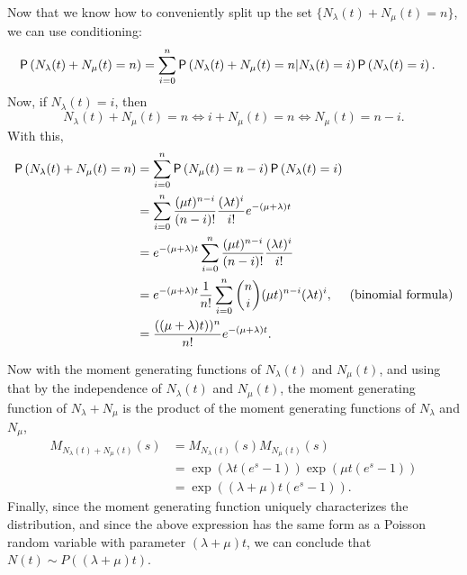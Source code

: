 \begin{exercise}
\begin{solution}
Now that we know how to conveniently split up the set $\{N_\lambda(t) + N_\mu(t) = n\}$,  we can use conditioning: 
  \begin{equation*}
    \begin{split}
\P{N_\lambda(t) + N_\mu(t) = n} 
&= \sum_{i=0}^n \P{N_\lambda(t) + N_\mu(t) = n|N_\lambda(t) = i}\P{N_\lambda(t)=i}.
\end{split}
\end{equation*}
Now, if $N_\lambda(t)=i$, then 
\begin{equation*}
N_\lambda(t)+N_\mu(t) = n \iff 
i+N_\mu(t) = n \iff 
N_\mu(t) = n-i.
\end{equation*}
With this, 
  \begin{align*}\label{eq:002}
\P{N_\lambda(t) + N_\mu(t) = n} 
&= \sum_{i=0}^n \P{ N_\mu(t) = n-i}\P{N_\lambda(t)=i} \\
&= \sum_{i=0}^n \frac{(\mu t)^{n-i}}{(n-i)!} \frac{(\lambda t)^i}{i!} e^{-(\mu+\lambda)t} \\
&= e^{-(\mu+\lambda)t} \sum_{i=0}^n \frac{(\mu t)^{n-i}}{(n-i)!} \frac{(\lambda t)^i}{i!}  \\
&= e^{-(\mu+\lambda)t}\frac 1{n!} \sum_{i=0}^n {n \choose i }(\mu t)^{n-i}(\lambda t)^i, \quad\text{ (binomial formula)}   \\
&= \frac{((\mu+\lambda)t))^n}{n!}e^{-(\mu+\lambda)t}.
  \end{align*}

  Now with the moment generating functions of $N_\lambda(t)$ and $N_\mu(t)$, and using that by the independence of $N_\lambda(t)$ and $N_\mu(t)$, the moment generating function of $N_\lambda + N_\mu$ is the product of the moment generating functions of $N_\lambda$ and $N_\mu$,
\begin{align*}
M_{N_\lambda(t)+N_\mu(t)}(s) 
&= M_{N_\lambda(t)}(s) M_{N_{\mu}(t)}(s) \\
&=\exp(\lambda t (e^s -1)) \exp(\mu t(e^s-1)) \\
&= \exp((\lambda + \mu)t (e^s-1)).
\end{align*}
Finally, since  the moment generating function uniquely characterizes
the distribution, and since the above expression has the same form as a Poisson random variable  with parameter $(\lambda+\mu)t$, we can conclude that $N(t)\sim P((\lambda +\mu) t)$.
    \end{solution}
\end{exercise}


